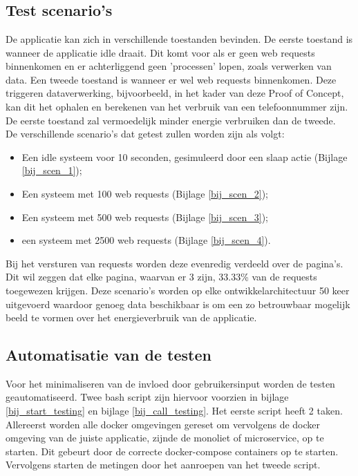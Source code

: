 

\chapter{}
\label{ch:test-poc}
\section{Test scenario's}
De applicatie kan zich in verschillende toestanden bevinden. De eerste toestand is wanneer de applicatie idle draait. Dit komt voor als er geen web requests binnenkomen en er achterliggend geen 'processen' lopen, zoals verwerken van data. Een tweede toestand is wanneer er wel web requests binnenkomen. Deze triggeren dataverwerking, bijvoorbeeld, in het kader van deze Proof of Concept, kan dit het ophalen en berekenen van het verbruik van een telefoonnummer zijn. De eerste toestand zal vermoedelijk minder energie verbruiken dan de tweede.\\

De verschillende scenario's dat getest zullen worden zijn als volgt:
\begin{itemize}
    \item Een idle systeem voor 10 seconden, gesimuleerd door een slaap actie (Bijlage \ref{bij_scen_1});
    \item Een systeem met 100 web requests (Bijlage \ref{bij_scen_2});
    \item Een systeem met 500 web requests (Bijlage \ref{bij_scen_3});
    \item een systeem met 2500 web requests (Bijlage \ref{bij_scen_4}).
\end{itemize}

Bij het versturen van requests worden deze evenredig verdeeld over de pagina's. Dit wil zeggen dat elke pagina, waarvan er 3 zijn, 33.33\% van de requests toegewezen krijgen. Deze scenario's worden op elke ontwikkelarchitectuur 50 keer uitgevoerd waardoor genoeg data beschikbaar is om een zo betrouwbaar mogelijk beeld te vormen over het energieverbruik van de applicatie.

\section{Automatisatie van de testen}\label{tpoc_auto_test}
Voor het minimaliseren van de invloed door gebruikersinput worden de testen geautomatiseerd. Twee bash script zijn hiervoor voorzien in bijlage \ref{bij_start_testing} en bijlage \ref{bij_call_testing}. Het eerste script heeft 2 taken. Allereerst worden alle docker omgevingen gereset om vervolgens de docker omgeving van de juiste applicatie, zijnde de monoliet of microservice, op te starten. Dit gebeurt door de correcte docker-compose containers op te starten. Vervolgens starten de metingen door het aanroepen van het tweede script. \\

